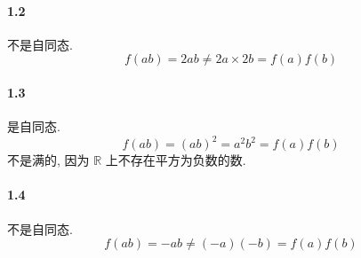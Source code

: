 \documentclass[12pt]{ctexart}
\theoremstyle{definition}
\theoremstyle{definition}
\theoremstyle{plain}
\theoremstyle{remark}
\begin{document}
\paragraph{1.2} 
不是自同态. 
\begin{equation}
	f (ab ) = 2 a b \ne 2 a \times 2b  = f(a) f(b) 
\end{equation}

\paragraph{1.3} 
是自同态. 
\begin{equation}
	f (a b) = (a b ) ^{2} = a ^{2} b ^{2} = f (a) f (b) 
\end{equation}
不是满的, 因为 \(\mathbb{R}\) 上不存在平方为负数的数. 

\paragraph{1.4} 
不是自同态. 
\begin{equation}
	f (ab ) = - ab \ne (-a) (-b) = f(a) f(b) 
\end{equation}
\end{document}
